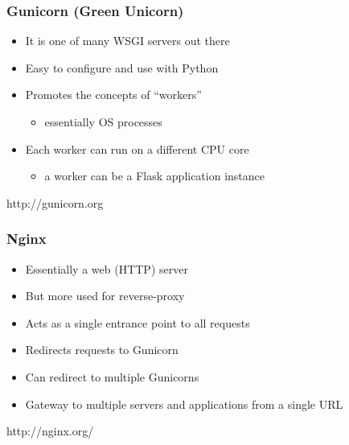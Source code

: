 \documentclass{beamer}
\begin{document}
\begin{frame}
\frametitle<presentation>{Gunicorn (Green Unicorn)}


\begin{itemize}
  \item It is one of many WSGI servers out there
  \item Easy to configure and use with Python
  \item Promotes the concepts of ``workers''
  \begin{itemize} \item essentially OS processes \end{itemize}
  \item Each worker can run on a different CPU core
  \begin{itemize} \item a worker can be a Flask application instance
  \end{itemize}
\end{itemize}

\centering
\footnotesize{http://gunicorn.org}

\end{frame}

\begin{frame}
\frametitle<presentation>{Nginx}


\begin{itemize}
  \item Essentially a web (HTTP) server
  \item But more used for reverse-proxy
  \item Acts as a single entrance point to all requests
  \item Redirects requests to Gunicorn
  \item Can redirect to multiple Gunicorns
  \item Gateway to multiple servers and applications from a single URL
\end{itemize}

\centering
\footnotesize{http://nginx.org/}

\end{frame}
\end{document}
